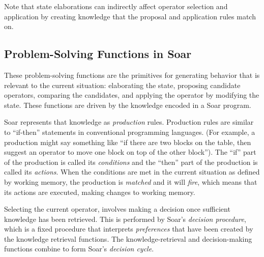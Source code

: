 Note that state elaborations can indirectly affect operator selection
and application by creating knowledge that the proposal and application
rules match on.

\subsection{Problem-Solving Functions in Soar}
\label{ARCH-functions}

These problem-solving functions are the primitives for generating 
behavior that is relevant to the current situation: elaborating the 
state, proposing candidate operators, comparing the candidates, 
and applying the operator by modifying the state. 
These functions are driven by the knowledge encoded in a Soar program.

Soar represents that knowledge as \textit{production} rules.  
Production rules are similar to ``if-then'' statements in conventional 
programming languages. (For example, a
production might say something like ``if there are two blocks on the
table, then suggest an operator to move one block on top of the other
block'').  The ``if'' part of the production is called its
\textit{conditions} and the ``then'' part of the production is called
its \textit{actions}. When the conditions are met in the current
situation as defined by working memory, the production is \emph{matched}
and it will \emph{fire}, which means that its actions are executed,
making changes to working memory. 

Selecting the current operator, involves making a
decision once sufficient knowledge has been retrieved.  This is
performed by Soar's \emph{decision procedure}, which is a fixed
procedure that interprets \emph{preferences} that have been created by
the knowledge retrieval functions. The knowledge-retrieval and decision-making
functions combine to form Soar's \emph{decision cycle}.


